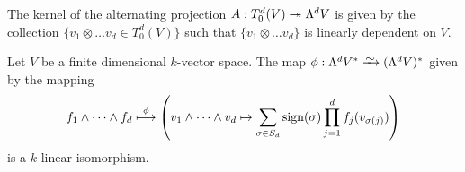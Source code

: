 \begin{corollary}\label{cor:kernel-alternating-projection}
  The kernel of the alternating projection \(A: T^d_0(V) \twoheadrightarrow \Lambda^d V\) is given
  by the collection \(\{v_{1} \otimes \dots v_d \in T^d_0(V)\}\) such that \(\{v_{1} \otimes
  \dots v_d\}\) is linearly dependent on \(V\).
\end{corollary}

\begin{theorem}\label{thm:iso-measure-volume-ext}
Let \(V\) be a finite dimensional \(k\)-vector space. The map \(\phi: \Lambda^d V^{*}
\isoto (\Lambda^dV)^{*}\) given by the mapping
\[
  f_1 \wedge \dots \wedge f_d \overset{\phi}\longmapsto \left(
    v_1 \wedge \dots \wedge v_d \mapsto
    \sum_{\sigma \in S_d} \operatorname{sign}(\sigma) \prod_{j=1}^d f_j(v_{\sigma(j)})
  \right)
\]
is a \(k\)-linear isomorphism.
\end{theorem}

